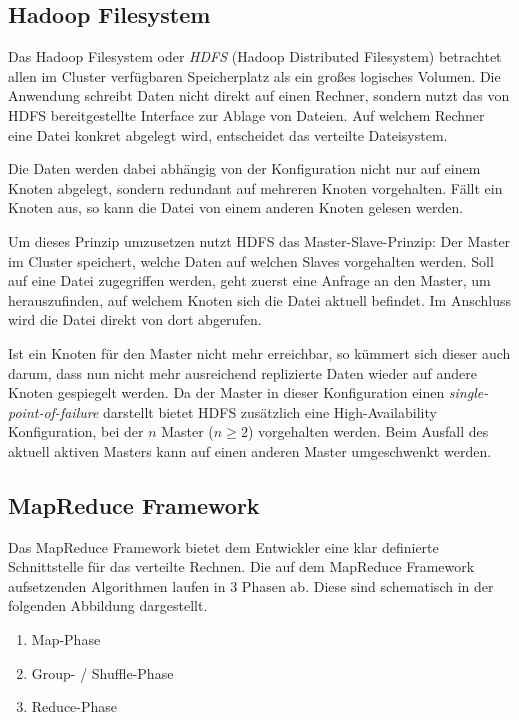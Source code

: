 \documentclass[a4paper,11pt]{scrartcl}
\begin{document}
\subsection{Hadoop Filesystem}

Das Hadoop Filesystem oder \textit{HDFS} (Hadoop Distributed Filesystem)
betrachtet allen im Cluster verfügbaren Speicherplatz als ein großes logisches
Volumen. Die Anwendung schreibt Daten nicht direkt auf einen Rechner, sondern
nutzt das von HDFS bereitgestellte Interface zur Ablage von Dateien. Auf
welchem Rechner eine Datei konkret abgelegt wird, entscheidet das verteilte
Dateisystem.

Die Daten werden dabei abhängig von der Konfiguration nicht nur auf einem
Knoten abgelegt, sondern redundant auf mehreren Knoten vorgehalten. Fällt ein
Knoten aus, so kann die Datei von einem anderen Knoten gelesen werden.


Um dieses Prinzip umzusetzen nutzt HDFS das Master-Slave-Prinzip: Der Master im
Cluster speichert, welche Daten auf welchen Slaves vorgehalten werden. Soll auf
eine Datei zugegriffen werden, geht zuerst eine Anfrage an den Master, um
herauszufinden, auf welchem Knoten sich die Datei aktuell befindet. Im
Anschluss wird die Datei direkt von dort abgerufen.

Ist ein Knoten für den Master nicht mehr erreichbar, so kümmert sich dieser
auch darum, dass nun nicht mehr ausreichend replizierte Daten wieder auf andere
Knoten gespiegelt werden. Da der Master in dieser Konfiguration einen
\textit{single-point-of-failure} darstellt bietet HDFS zusätzlich eine
High-Availability Konfiguration, bei der $n$ Master ($n \geq 2$) vorgehalten
werden. Beim Ausfall des aktuell aktiven Masters kann auf einen anderen Master
umgeschwenkt werden.


\subsection{MapReduce Framework}
Das MapReduce Framework bietet dem Entwickler eine klar definierte
Schnittstelle für das verteilte Rechnen. Die auf dem MapReduce Framework
aufsetzenden Algorithmen laufen in 3 Phasen ab. Diese sind schematisch in der
folgenden Abbildung dargestellt.

\begin{enumerate}
  \item Map-Phase
  \item Group- / Shuffle-Phase
  \item Reduce-Phase
\end{enumerate}
\end{document}
